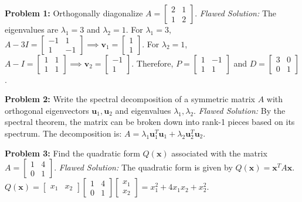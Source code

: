 \documentclass[11pt, letterpaper]{article}
\theoremstyle{definition}
\theoremstyle{remark}
\begin{document}
\vspace{1em}
\textbf{Problem 1:} Orthogonally diagonalize $A = \begin{bmatrix} 2 & 1 \\ 1 & 2 \end{bmatrix}$.
\textit{Flawed Solution:}
The eigenvalues are $\lambda_1 = 3$ and $\lambda_2 = 1$.
For $\lambda_1 = 3$, $A - 3I = \begin{bmatrix} -1 & 1 \\ 1 & -1 \end{bmatrix} \implies \mathbf{v}_1 = \begin{bmatrix} 1 \\ 1 \end{bmatrix}$.
For $\lambda_2 = 1$, $A - I = \begin{bmatrix} 1 & 1 \\ 1 & 1 \end{bmatrix} \implies \mathbf{v}_2 = \begin{bmatrix} -1 \\ 1 \end{bmatrix}$.
Therefore, $P = \begin{bmatrix} 1 & -1 \\ 1 & 1 \end{bmatrix}$ and $D = \begin{bmatrix} 3 & 0 \\ 0 & 1 \end{bmatrix}$.

\textbf{Problem 2:} Write the spectral decomposition of a symmetric matrix $A$ with orthogonal eigenvectors $\mathbf{u}_1, \mathbf{u}_2$ and eigenvalues $\lambda_1, \lambda_2$.
\textit{Flawed Solution:}
By the spectral theorem, the matrix can be broken down into rank-1 pieces based on its spectrum. The decomposition is:
$A = \lambda_1 \mathbf{u}_1^T \mathbf{u}_1 + \lambda_2 \mathbf{u}_2^T \mathbf{u}_2$.

\textbf{Problem 3:} Find the quadratic form $Q(\mathbf{x})$ associated with the matrix $A = \begin{bmatrix} 1 & 4 \\ 0 & 1 \end{bmatrix}$.
\textit{Flawed Solution:}
The quadratic form is given by $Q(\mathbf{x}) = \mathbf{x}^T A \mathbf{x}$.
$Q(\mathbf{x}) = \begin{bmatrix} x_1 & x_2 \end{bmatrix} \begin{bmatrix} 1 & 4 \\ 0 & 1 \end{bmatrix} \begin{bmatrix} x_1 \\ x_2 \end{bmatrix} = x_1^2 + 4x_1 x_2 + x_2^2$.
\end{document}
